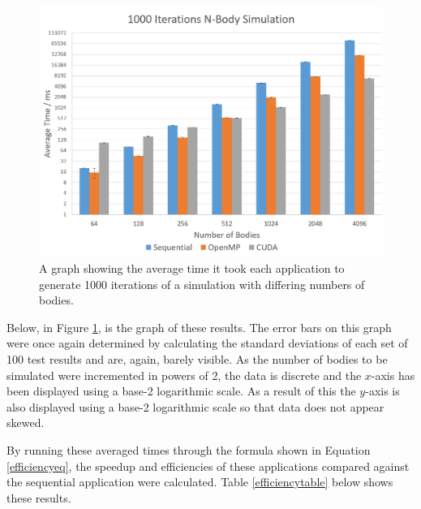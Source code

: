 \documentclass[12pt,journal,transmag]{IEEEtran}
\begin{document}
	\begin{figure}[!h]
		\centering
		\includegraphics[width=1.5\columnwidth]{IMAGES/perfcomp1}
		\caption{A graph showing the average time it took each application to generate 1000 iterations of a simulation with differing numbers of bodies.}
		\label{graph2}
	\end{figure}
	
	Below, in Figure \ref{graph2}, is the graph of these results. The error bars on this graph were once again determined by calculating the standard deviations of each set of 100 test results and are, again, barely visible. As the number of bodies to be simulated were incremented in powers of 2, the data is discrete and the $x$-axis has been displayed using a base-2 logarithmic scale. As a result of this the $y$-axis is also displayed using a base-2 logarithmic scale so that data does not appear skewed.
	
	By running these averaged times through the formula shown in Equation \ref{efficiencyeq}, the speedup and efficiencies of these applications compared against the sequential application were calculated. Table \ref{efficiencytable} below shows these results.
\end{document}
